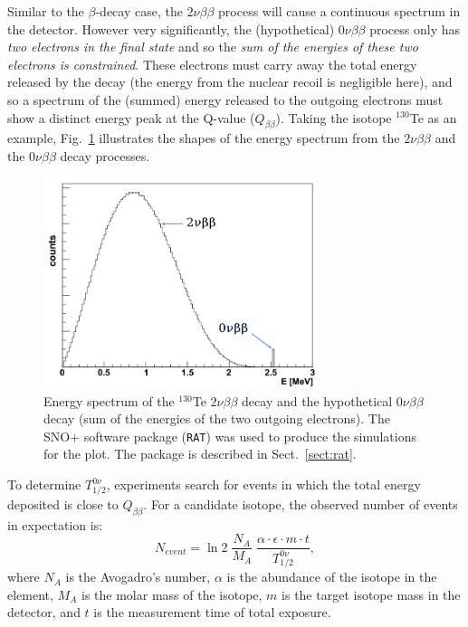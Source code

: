 Similar to the $\beta$-decay case, the $2\nu\beta\beta$ process will cause a continuous spectrum in the detector. However very significantly, the (hypothetical) $0\nu\beta\beta$ process only has {\em two electrons in the final state} and so the {\em sum of the energies of these two electrons is constrained}. These electrons must carry away the total energy released by the decay (the energy from the nuclear recoil is negligible here), and so a spectrum of the (summed) energy released to the outgoing electrons must show a distinct energy peak at the Q-value ($Q_{\beta\beta}$). Taking the isotope $^{130}$Te as an example, Fig.~\ref{te130energy} illustrates the shapes of the energy spectrum from the $2\nu\beta\beta$ and the $0\nu\beta\beta$ decay processes.
\begin{figure}[htbp]
	\centering	
	\includegraphics[width=8cm]{Te130_energy0vbb.png}
	\caption[Energy spectrum of the $^{130}$Te $2\nu\beta\beta$ decay and the hypothetical $0\nu\beta\beta$ decay.]{Energy spectrum of the $^{130}$Te $2\nu\beta\beta$ decay and the hypothetical $0\nu\beta\beta$ decay (sum of the energies of the two outgoing electrons). The SNO+ software package (\texttt{RAT}) was used to produce the simulations for the plot. The package is described in Sect.~\ref{sect:rat}.}
	\label{te130energy}
\end{figure}

To determine $T^{0\nu}_{1/2}$, experiments search for events in which the total energy deposited is close to $Q_{\beta\beta}$. For a candidate isotope, the observed number of events in expectation is: 
\begin{equation}
N_{event} = \ln 2 \; \frac{N_A}{M_A} \; \frac{\alpha\cdot\epsilon\cdot m\cdot t}{T^{0\nu}_{1/2}},
\end{equation}
where $N_A$ is the Avogadro's number, $\alpha$ is the abundance of the isotope in the element, $M_A$ is the molar mass of the isotope, $m$ is the target isotope mass in the detector, and $t$ is the measurement time of total exposure.

